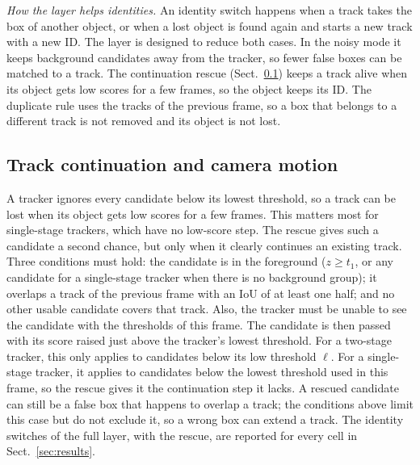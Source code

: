 \documentclass[pdflatex,sn-mathphys-num,iicol]{sn-jnl}
\begin{document}
\emph{How the layer helps identities.} An identity switch happens when a track
takes the box of another object, or when a lost object is found again and
starts a new track with a new ID. The layer is designed to reduce both cases.
In the noisy mode it keeps background candidates away from the tracker, so
fewer false boxes can be matched to a track. The continuation rescue
(Sect.~\ref{sec:rescue}) keeps a track alive when its object gets low scores
for a few frames, so the object keeps its ID. The duplicate rule uses the
tracks of the previous frame, so a box that belongs to a different track is
not removed and its object is not lost.

\subsection{Track continuation and camera motion}\label{sec:rescue}
A tracker ignores every candidate below its lowest threshold, so a track can
be lost when its object gets low scores for a few frames. This matters most
for single-stage trackers, which have no low-score step. The rescue gives
such a candidate a second chance, but only when it clearly continues an
existing track. Three conditions must hold: the candidate is in the
foreground ($z\ge t_1$, or any candidate for a single-stage tracker when
there is no background group); it overlaps a track of the previous frame
with an IoU of at least one half; and no other usable candidate covers that
track. Also, the tracker must be unable to see the candidate with the
thresholds of this frame. The candidate is then passed with its score raised
just above the tracker's lowest threshold. For a two-stage tracker, this only
applies to candidates below its low threshold $\ell$. For a single-stage
tracker, it applies to candidates below the lowest threshold used in this
frame, so the rescue gives it the continuation step it lacks. A rescued
candidate can still be a false box that happens to overlap a track; the
conditions above limit this case but do not exclude it, so a wrong box can
extend a track. The identity switches of the full layer, with the rescue,
are reported for every cell in Sect.~\ref{sec:results}.
\end{document}
